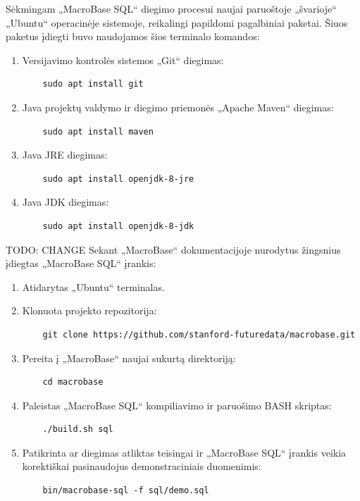 \documentclass{VUMIFPSbakalaurinis}
\begin{document}
Sėkmingam „MacroBase SQL“ diegimo procesui naujai paruoštoje „švarioje“ „Ubuntu“ operacinėje sistemoje, reikalingi papildomi pagalbiniai paketai. Šiuos paketus įdiegti buvo naudojamos šios terminalo komandos:
\begin{enumerate}
	\item Versijavimo kontrolės sistemos „Git“ diegimas:
	\begin{verbatim}
	sudo apt install git
	\end{verbatim}
	\item Java projektų valdymo ir diegimo priemonės „Apache Maven“ diegimas:
	\begin{verbatim}
	sudo apt install maven
	\end{verbatim}
	\item Java JRE diegimas:
	\begin{verbatim}
	sudo apt install openjdk-8-jre
	\end{verbatim}
	\item Java JDK diegimas:
	\begin{verbatim}
	sudo apt install openjdk-8-jdk
	\end{verbatim}
\end{enumerate}

TODO: CHANGE
Sekant „MacroBase“ dokumentacijoje nurodytus žingsnius įdiegtas „MacroBase SQL“ įrankis:
\begin{enumerate}
	\item Atidarytas „Ubuntu“ terminalas.
	\item Klonuota projekto repozitorija:
	\begin{verbatim}
	git clone https://github.com/stanford-futuredata/macrobase.git
	\end{verbatim}
	\item Pereita į „MacroBase“ naujai sukurtą direktoriją:
	\begin{verbatim}
	cd macrobase
	\end{verbatim}
	\item Paleistas „MacroBase SQL“ kompiliavimo ir paruošimo BASH skriptas:
	\begin{verbatim}
	./build.sh sql
	\end{verbatim}
	\item Patikrinta ar diegimas atliktas teisingai ir „MacroBase SQL“ įrankis veikia korektiškai pasinaudojus demonstraciniais duomenimis:
	\begin{verbatim}
	bin/macrobase-sql -f sql/demo.sql
	\end{verbatim}
\end{enumerate}
\end{document}
